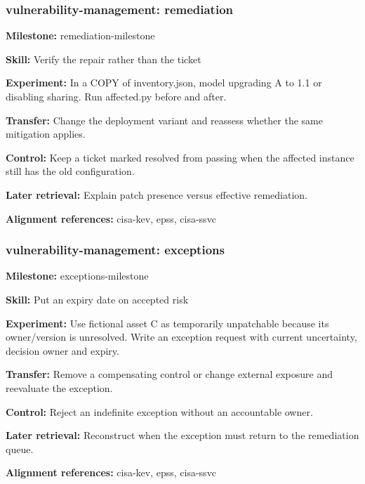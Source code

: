 \subsubsection{vulnerability-management: remediation}
\noindent\textbf{Milestone:} remediation-milestone\par
\noindent\textbf{Skill:} Verify the repair rather than the ticket\par
\noindent\textbf{Experiment:} In a COPY of inventory.json, model upgrading A to 1.1 or disabling sharing. Run affected.py before and after.\par
\noindent\textbf{Transfer:} Change the deployment variant and reassess whether the same mitigation applies.\par
\noindent\textbf{Control:} Keep a ticket marked resolved from passing when the affected instance still has the old configuration.\par
\noindent\textbf{Later retrieval:} Explain patch presence versus effective remediation.\par
\noindent\textbf{Alignment references:} cisa-kev, epss, cisa-ssvc\par
\subsubsection{vulnerability-management: exceptions}
\noindent\textbf{Milestone:} exceptions-milestone\par
\noindent\textbf{Skill:} Put an expiry date on accepted risk\par
\noindent\textbf{Experiment:} Use fictional asset C as temporarily unpatchable because its owner/version is unresolved. Write an exception request with current uncertainty, decision owner and expiry.\par
\noindent\textbf{Transfer:} Remove a compensating control or change external exposure and reevaluate the exception.\par
\noindent\textbf{Control:} Reject an indefinite exception without an accountable owner.\par
\noindent\textbf{Later retrieval:} Reconstruct when the exception must return to the remediation queue.\par
\noindent\textbf{Alignment references:} cisa-kev, epss, cisa-ssvc\par
